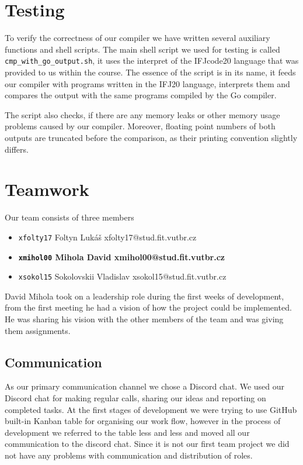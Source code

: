 \documentclass[12pt]{article}
\begin{document}
\section{Testing}
To verify the correctness of our compiler we have written several auxiliary functions and shell scripts. The main shell script we used for testing is called \texttt{cmp\_with\_go\_output.sh}, it uses the interpret of the IFJcode20 language that was provided to us within the course.
The essence of the script is in its name, it feeds our compiler with programs written in the IFJ20 language, interprets them and compares the output with the same programs compiled by the Go compiler.\par
The script also checks, if there are any memory leaks or other memory usage problems caused by our compiler. Moreover, floating point numbers of both outputs are truncated before the comparison, as their printing convention slightly differs. 
\\
\section{Teamwork}

Our team consists of three members
\begin{itemize}
 		\item \texttt{xfolty17} Foltyn Lukáš xfolty17@stud.fit.vutbr.cz
		\item  \textbf{\texttt{xmihol00} Mihola David xmihol00@stud.fit.vutbr.cz}
		\item \texttt{xsokol15} Sokolovskii Vladislav xsokol15@stud.fit.vutbr.cz
\end{itemize} 	
David Mihola took on a leadership role during the first weeks of development, from the first meeting he had a vision of how the project could be implemented. He was sharing his vision with the other members of the team and was giving them assignments.

\subsection{Communication}
	As our primary communication channel we chose a Discord chat. We used our Discord chat for making regular calls, sharing our ideas and reporting on completed tasks. At the first stages of development we were trying to use GitHub built-in Kanban table for organising our work flow, however in the process of development we referred to the table less and less and moved all our communication to the discord chat. Since it is not our first team project we did not have any problems with communication and distribution of roles.
\end{document}
